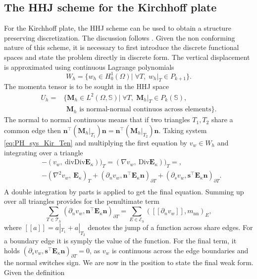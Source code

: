 \documentclass{ifacconf}
\begin{document}
\subsection{The HHJ scheme for the Kirchhoff plate}
For the Kirchhoff plate, the HHJ scheme can be used to obtain a structure preserving discretization. The discussion follows \cite{arnold2019hellan}. Given the non conforming nature of this scheme, it is necessary to first introduce the discrete functional spaces and state the problem directly in discrete form. The vertical displacement is approximated using continuous Lagrange polynomials
\[
W_h = \{w_h \in H^1_0(\Omega)| \; \forall T, \; w_h|_{T} \in P_{k+1} \}.
\]
The momenta tensor is to be sought in the HHJ space
\begin{equation*}
\begin{aligned}
U_h = &\{\bm{M}_h \in L^2(\Omega, \mathbb{S})| \; \forall T, \; \bm{M}_h|_{T} \in P_{k}(\mathbb{S}) , \\ &\, \ \bm{M}_h \text{ is normal-normal continuos across elements}\}.
\end{aligned}
\end{equation*}
The normal to normal continuous means that if two triangles $T_1, T_2$ share a common edge then $\bm{n}^\top (\bm{M}_h|_{T_1}) \bm{n} = \bm{n}^\top (\bm{M}_h|_{T_2}) \bm{n}$. Taking system \eqref{eq:PH_sys_Kir_Ten} and multiplying the first equation by $v_w \in W_h$ and integrating over a triangle
\begin{equation*}
	\begin{aligned}
	& - (v_w, \ \mathrm{div}\mathrm{Div} \bm{E}_\kappa))_{T} = (\nabla v_w, \ \mathrm{Div} \bm{E}_\kappa))_{T}=, \\
	& -(\nabla^2 v_w, \ \bm{E}_\kappa)_T + (\partial_n v_w, \bm{n}^\top\bm{E}_\kappa \bm{n})_{\partial T} + (\partial_s v_w, \bm{s}^\top\bm{E}_\kappa \bm{n})_{\partial T}. \\
	\end{aligned}
\end{equation*}
A double integration by parts is applied to get the final equation. Summing up over all triangles provides for the penultimate term
\begin{equation*}
\sum_{T \in \mathcal{T}_h} (\partial_n v_w, \bm{n}^\top\bm{E}_\kappa \bm{n})_{\partial T} = \sum_{E \in \mathcal{E}_h} ([\![\partial_n v_w]\!], m_{\text{nn}})_{E},
\end{equation*} 
where $[\![a]\!] = a|_{T_1} + a|_{T_2}$ denotes the jump of a function across share edges. For a boundary edge it is symply the value of the function. For the final term, it holds $(\partial_s v_w, \bm{s}^\top\bm{E}_\kappa \bm{n})_{\partial T}=0$, as $v_w$ is continuous across the edge boundaries and the normal switches sign. We are now in the position to state the final weak form. Given the definition
\end{document}
